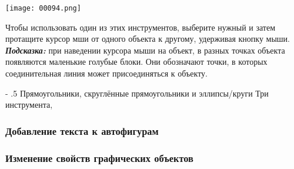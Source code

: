 \documentclass[a4paper,10pt]{article}
\makeatletter
\renewcommand\paragraph{%
   \@startsection{paragraph}{4}{0mm}%
      {-\baselineskip}%
      {.5\baselineskip}%
      {\normalfont\normalsize\bfseries}}
\makeatother
\begin{document}
\texttt{[image: 00094.png]}

Чтобы использовать один из этих инструментов, выберите нужный и затем протащите курсор мши от одного объекта к другому, удерживая кнопку мыши. \textit{\textbf{Подсказка:}} при наведении курсора мыши на объект, в разных точках объекта появляются маленькие голубые блоки. Они обозначают точки, в которых соединительная линия может присоединяться к объекту.

\paragraph{Прямоугольники, скруглённые прямоугольники и эллипсы/круги}
Три инструмента, 



\subsubsection{Добавление текста к автофигурам}
\subsubsection{Изменение свойств графических объектов}
\end{document}
